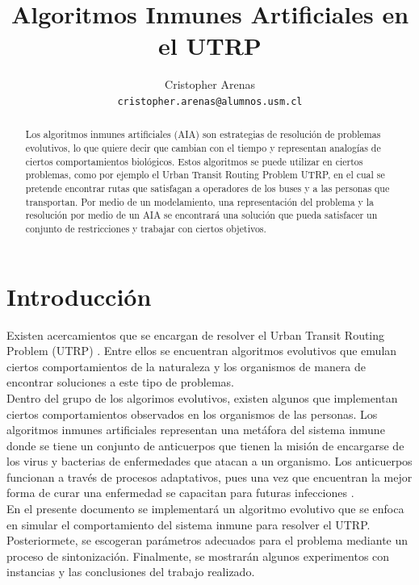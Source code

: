 \documentclass{llncs}
\title{Algoritmos Inmunes Artificiales en el UTRP}
\author{Cristopher Arenas\\\texttt{cristopher.arenas@alumnos.usm.cl}}
\institute{Departamento de Informática\\Universidad Técnica Federico Santa María}
\begin{document}
\maketitle

\begin{abstract}
Los algoritmos inmunes artificiales (AIA) son estrategias de resolución de problemas evolutivos, lo que quiere decir que cambian con el tiempo y representan analogías de ciertos comportamientos biológicos. Estos algoritmos se puede utilizar en ciertos problemas, como por ejemplo el Urban Transit Routing Problem UTRP, en el cual se pretende encontrar rutas que satisfagan a operadores de los buses y a las personas que transportan. Por medio de un modelamiento, una representación del problema y la resolución por medio de un AIA se encontrará una solución que pueda satisfacer un conjunto de restricciones y trabajar con ciertos objetivos.
\end{abstract}

\section{Introducción}

Existen acercamientos que se encargan de resolver el Urban Transit Routing Problem (UTRP) \cite{metaheuristic2010}. Entre ellos se encuentran algoritmos evolutivos que emulan ciertos comportamientos de la naturaleza y los organismos de manera de encontrar soluciones a este tipo de problemas. \\

Dentro del grupo de los algorimos evolutivos, existen algunos que implementan ciertos comportamientos observados en los organismos de las personas. Los algoritmos inmunes artificiales representan una metáfora del sistema inmune donde se tiene un conjunto de anticuerpos que tienen la misión de encargarse de los virus y bacterias de enfermedades que atacan a un organismo. Los anticuerpos funcionan a través de procesos adaptativos, pues una vez que encuentran la mejor forma de curar una enfermedad se capacitan para futuras infecciones \cite{introduction} \cite{sia}. \\

En el presente documento se implementará un algoritmo evolutivo que se enfoca en simular el comportamiento del sistema inmune para resolver el UTRP. Posteriormete, se escogeran parámetros adecuados para el problema mediante un proceso de sintonización. Finalmente, se mostrarán algunos experimentos con instancias y las conclusiones del trabajo realizado.
\end{document}
